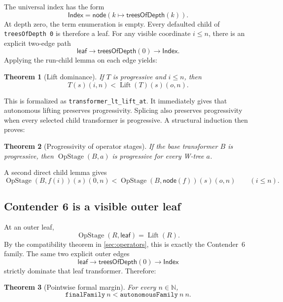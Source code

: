 \documentclass[11pt]{article}
\newtheorem{theorem}{Theorem}[section]
\theoremstyle{definition}
\theoremstyle{remark}
\newcommand{\N}{\mathbb{N}}
\newcommand{\Lift}{\operatorname{Lift}}
\newcommand{\OpStage}{\operatorname{OpStage}}
\newcommand{\Index}{\mathsf{Index}}
\newcommand{\lean}[1]{\texttt{#1}}
\begin{document}
The universal index has the form
\[
  \Index=\mathsf{node}(k\mapsto\mathsf{treesOfDepth}(k)).
\]
At depth zero, the term enumeration is empty.  Every defaulted child of
\lean{treesOfDepth 0} is therefore a leaf.  For any visible coordinate
\(i\le n\), there is an explicit two-edge path
\[
  \mathsf{leaf}
  \longrightarrow \mathsf{treesOfDepth}(0)
  \longrightarrow \Index.
\]
Applying the run-child lemma on each edge yields:

\begin{theorem}[Lift dominance]
If \(T\) is progressive and \(i\le n\), then
\[
  T(s)(i,n)<\Lift(T)(s)(o,n).
\]
\end{theorem}

This is formalized as \lean{transformer\_lt\_lift\_at}.  It immediately gives
that autonomous lifting preserves progressivity.  Splicing also preserves
progressivity when every selected child transformer is progressive.  A
structural induction then proves:

\begin{theorem}[Progressivity of operator stages]
If the base transformer \(B\) is progressive, then
\(\OpStage(B,a)\) is progressive for every W-tree \(a\).
\end{theorem}

A second direct child lemma gives
\[
 \OpStage(B,f(i))(s)(0,n)
 <\OpStage(B,\mathsf{node}(f))(s)(o,n)
 \qquad(i\le n).
\]

\subsection{Contender 6 is a visible outer leaf}

At an outer leaf,
\[
  \OpStage(R,\mathsf{leaf})=\Lift(R).
\]
By the compatibility theorem in \cref{sec:operators}, this is exactly the
Contender~6 family.  The same two explicit outer edges
\[
  \mathsf{leaf}
  \longrightarrow \mathsf{treesOfDepth}(0)
  \longrightarrow \Index
\]
strictly dominate that leaf transformer.  Therefore:

\begin{theorem}[Pointwise formal margin]
For every \(n\in\N\),
\[
  \lean{finalFamily}\ n
  <\lean{autonomousFamily}\ n\ n.
\]
\end{theorem}
\end{document}
